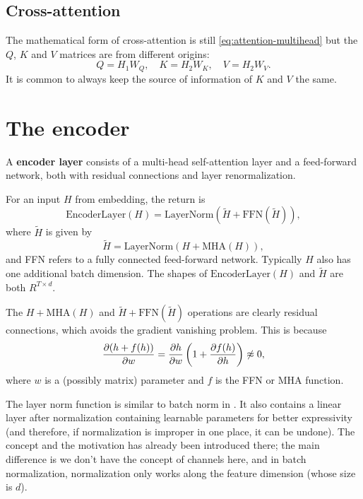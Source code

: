 \documentclass[hyperref, a4paper, 12pt]{report}
\newcommand*{\concept}[1]{{\textbf{#1}}}
\def\mathbb#1{#1}%
\begin{document}
\subsection{Cross-attention}

The mathematical form of cross-attention is still \eqref{eq:attention-multihead} but the $Q$, $K$ and $V$ matrices are from different origins:
\begin{equation}
    Q = H_1 W_Q, \quad K = H_2 W_K, \quad V = H_2 W_V.
\end{equation}
It is common to always keep the source of information of $K$ and $V$ the same.

\section{The encoder}

A \concept{encoder layer} consists of a multi-head self-attention layer and a feed-forward network,
both with residual connections and layer renormalization.

For an input $H$ from embedding, the return is 
\begin{equation}
    \mathrm{EncoderLayer}(H) = \mathrm{LayerNorm}(\tilde{H} + \mathrm{FFN}(\tilde{H})),
\end{equation}
where $\tilde{H}$ is given by 
\begin{equation}
    \tilde{H} = \mathrm{LayerNorm}(H + \mathrm{MHA}(H)),
\end{equation}
and FFN refers to a fully connected feed-forward network.
Typically $H$ also has one additional batch dimension.
The shapes of $\mathrm{EncoderLayer}(H)$ and $\tilde{H}$ are both $\mathbb{R}^{T \times d}$.

The $H + \mathrm{MHA}(H)$ and $\tilde{H} + \mathrm{FFN}(\tilde{H})$ operations are clearly residual connections,
which avoids the gradient vanishing problem.
This is because 
\begin{equation}
    \pdv{(h + f(h))}{w} = \pdv{h}{w} \left( 1 + \pdv{f(h)}{h} \right) \not\approx 0,
\end{equation}
where $w$ is a (possibly matrix) parameter and $f$ is the FFN or MHA function.

The layer norm function is similar to batch norm in .
It also contains a linear layer after normalization containing learnable parameters for better expressivity
(and therefore, if normalization is improper in one place, it can be undone).
The concept and the motivation has already been introduced there;
the main difference is we don't have the concept of channels here,
and in batch normalization, normalization only works along the feature dimension (whose size is $d$).
\end{document}
